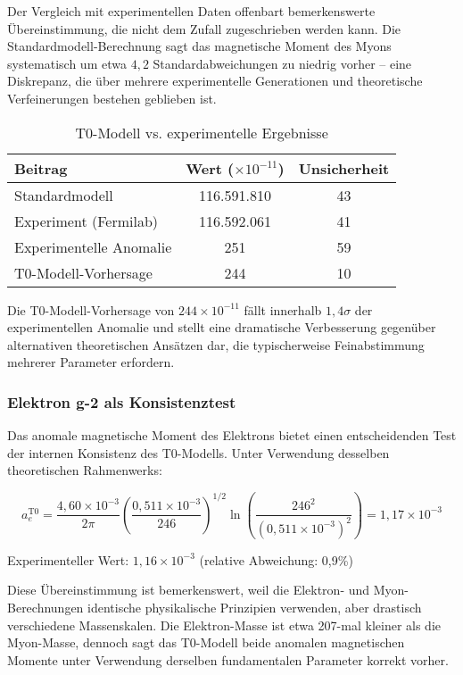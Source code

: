 \documentclass[12pt,a4paper]{article}
\begin{document}
	Der Vergleich mit experimentellen Daten offenbart bemerkenswerte Übereinstimmung, die nicht dem Zufall zugeschrieben werden kann. Die Standardmodell-Berechnung sagt das magnetische Moment des Myons systematisch um etwa $4{,}2$ Standardabweichungen zu niedrig vorher -- eine Diskrepanz, die über mehrere experimentelle Generationen und theoretische Verfeinerungen bestehen geblieben ist.
	
	\begin{table}[H]
		\centering
		\caption{T0-Modell vs. experimentelle Ergebnisse}
		\begin{tabular}{@{}lcc@{}}
			\toprule
			\textbf{Beitrag} & \textbf{Wert} ($\times 10^{-11}$) & \textbf{Unsicherheit} \\
			\midrule
			Standardmodell & 116.591.810 & 43 \\
			Experiment (Fermilab) & 116.592.061 & 41 \\
			Experimentelle Anomalie & 251 & 59 \\
			T0-Modell-Vorhersage & 244 & 10 \\
			\bottomrule
		\end{tabular}
	\end{table}
	
	Die T0-Modell-Vorhersage von $244 \times 10^{-11}$ fällt innerhalb $1{,}4\sigma$ der experimentellen Anomalie und stellt eine dramatische Verbesserung gegenüber alternativen theoretischen Ansätzen dar, die typischerweise Feinabstimmung mehrerer Parameter erfordern.
	
	\subsubsection{Elektron g-2 als Konsistenztest}
	
	Das anomale magnetische Moment des Elektrons bietet einen entscheidenden Test der internen Konsistenz des T0-Modells. Unter Verwendung desselben theoretischen Rahmenwerks:
	
	\begin{equation}
		a_e^{\text{T0}} = \frac{4{,}60 \times 10^{-3}}{2\pi} \left(\frac{0{,}511 \times 10^{-3}}{246}\right)^{1/2} \ln\left(\frac{246^2}{(0{,}511 \times 10^{-3})^2}\right) = 1{,}17 \times 10^{-3}
	\end{equation}
	
	Experimenteller Wert: $1{,}16 \times 10^{-3}$ (relative Abweichung: 0{,}9\%)
	
	Diese Übereinstimmung ist bemerkenswert, weil die Elektron- und Myon-Berechnungen identische physikalische Prinzipien verwenden, aber drastisch verschiedene Massenskalen. Die Elektron-Masse ist etwa 207-mal kleiner als die Myon-Masse, dennoch sagt das T0-Modell beide anomalen magnetischen Momente unter Verwendung derselben fundamentalen Parameter korrekt vorher.
	
\end{document}
